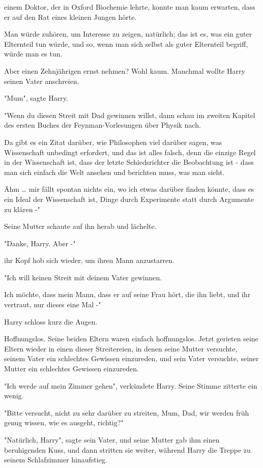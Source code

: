 {einem Doktor, der in Oxford Biochemie lehrte, konnte man kaum erwarten, dass er auf den Rat eines kleinen Jungen hörte.

Man würde zuhören, um Interesse zu zeigen, natürlich; das ist es, was ein guter Elternteil tun würde, und so, wenn man sich selbst als guter Elternteil begriff, würde man es tun.

Aber einen Zehnjährigen ernst nehmen? Wohl kaum. Manchmal wollte Harry seinen Vater anschreien.

"Mum", sagte Harry.

"Wenn du diesen Streit mit Dad gewinnen willst, dann schau im zweiten Kapitel des ersten Buches der Feynman-Vorlesungen über Physik nach.

Da gibt es ein Zitat darüber, wie Philosophen viel darüber sagen, was Wissenschaft unbedingt erfordert, und das ist alles falsch, denn die einzige Regel in der Wissenschaft ist, dass der letzte Schiedsrichter die Beobachtung ist - dass man sich einfach die Welt ansehen und berichten muss, was man sieht.

Ähm … mir fällt spontan nichts ein, wo ich etwas darüber finden könnte, dass es ein Ideal der Wissenschaft ist, Dinge durch Experimente statt durch Argumente zu klären -"

Seine Mutter schaute auf ihn herab und lächelte.

"Danke, Harry. Aber -"

ihr Kopf hob sich wieder, um ihren Mann anzustarren.

"Ich will keinen Streit mit deinem Vater gewinnen.

Ich möchte, dass mein Mann, dass er auf seine Frau hört, die ihn liebt, und ihr vertraut, nur dieses eine Mal -"

Harry schloss kurz die Augen.

Hoffnungslos. Seine beiden Eltern waren einfach hoffnungslos. Jetzt gerieten seine Eltern wieder in einen dieser Streitereien, in denen seine Mutter versuchte, seinem Vater ein schlechtes Gewissen einzureden, und sein Vater versuchte, seiner Mutter ein schlechtes Gewissen einzureden.

"Ich werde auf mein Zimmer gehen", verkündete Harry. Seine Stimme zitterte ein wenig.

"Bitte versucht, nicht zu sehr darüber zu streiten, Mum, Dad, wir werden früh genug wissen, wie es ausgeht, richtig?"

"Natürlich, Harry", sagte sein Vater, und seine Mutter gab ihm einen beruhigenden Kuss, und dann stritten sie weiter, während Harry die Treppe zu seinem Schlafzimmer hinaufstieg.

}
